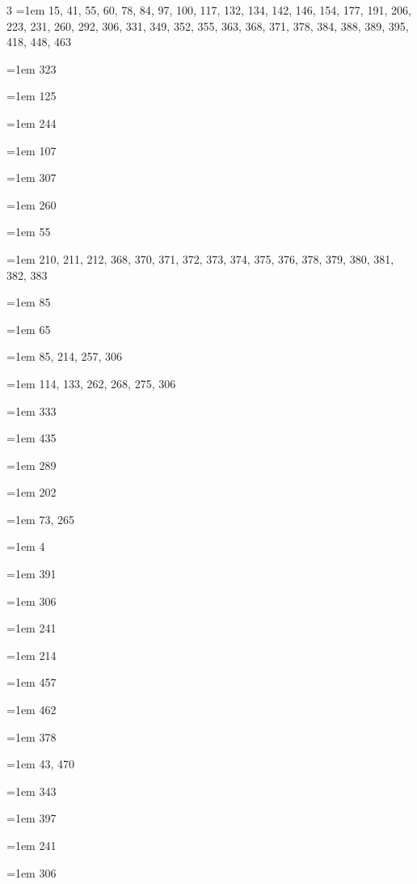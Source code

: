 \begin{multicols}{3}
\hangindent=1em  15, 41, 55, 60, 78, 84, 97, 100, 117, 132, 134, 142, 146, 154, 177, 191, 206, 223, 231, 260, 292, 306, 331, 349, 352, 355, 363, 368, 371, 378, 384, 388, 389, 395, 418, 448, 463\par
\hangindent=1em  323\par
\hangindent=1em  125\par
\hangindent=1em  244\par
\hangindent=1em  107\par
\hangindent=1em  307\par
\hangindent=1em  260\par
\hangindent=1em  55\par
\hangindent=1em  210, 211, 212, 368, 370, 371, 372, 373, 374, 375, 376, 378, 379, 380, 381, 382, 383\par
\hangindent=1em  85\par
\hangindent=1em  65\par
\hangindent=1em  85, 214, 257, 306\par
\hangindent=1em  114, 133, 262, 268, 275, 306\par
\hangindent=1em  333\par
\hangindent=1em  435\par
\hangindent=1em  289\par
\hangindent=1em  202\par
\hangindent=1em  73, 265\par
\hangindent=1em  4\par
\hangindent=1em  391\par
\hangindent=1em  306\par
\hangindent=1em  241\par
\hangindent=1em  214\par
\hangindent=1em  457\par
\hangindent=1em  462\par
\hangindent=1em  378\par
\hangindent=1em  43, 470\par
\hangindent=1em  343\par
\hangindent=1em  397\par
\hangindent=1em  241\par
\hangindent=1em  306\par

\end{multicols}
